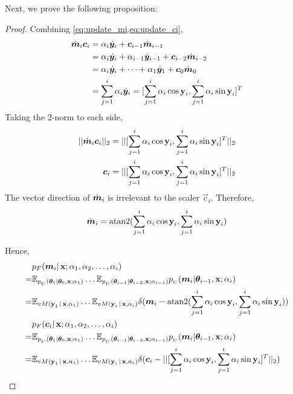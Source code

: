 Next, we prove the following proposition:
\cirflowequiv*
\begin{proof}
Combining \cref{eq:update_mi,eq:update_ci},
\begin{align*}
\dotm_{i}\vec{c}_i&=\alpha_i \doty_i+\vec{c}_{i-1}\dotm_{i-1}\\
&=\alpha_i \doty_i + \alpha_{i-1} \doty_{i-1}+\vec{c}_{i-2}\dotm_{i-2}\\
&=\alpha_i \doty_i + \dots + \alpha_{1} \doty_{1}+\vec{c}_0 \dotm_{0}\\
&=\sum_{j=1}^i \alpha_i \doty_i=[\sum_{j=1}^i \alpha_i\cos \y_i,\sum_{j=1}^i \alpha_i\sin \y_i]^T
\end{align*}
Taking the 2-norm to each side,
\begin{align*}
    ||\dotm_{i}\vec{c}_i||_2&=||[\sum_{j=1}^i \alpha_i\cos \y_i,\sum_{j=1}^i \alpha_i\sin \y_i]^T||_2\\
    \vec{c}_i&=||[\sum_{j=1}^i \alpha_i \cos \y_i,\sum_{j=1}^i \alpha_i \sin \y_i]^T||_2
\end{align*}
The vector direction of $\dotm_{i}$ is irrelevant to the scaler $\vec{c}_i$. Therefore,
\begin{equation}
    \dotm_{i}=\text{atan2}(\sum_{j=1}^i \alpha_i \cos \y_i,\sum_{j=1}^i \alpha_i \sin \y_i)
\end{equation}

Hence,
\begin{align*}
&p_F(\vec{m}_i|\x;\alpha_1,\alpha_2,\dots,\alpha_i)\\=&\E_{\update(\parsnt{1} \mid \parsnt{0}, \x ; \alphat{1})}\dots\E_{\update(\parsn_{i-1} \mid \parsnt{i-2}, \x; \alphat{i-1})} \update(\vm_{i} | \parsnt{i-1},\x;\alphat{i} ) \\
=& \E_{vM(\y_1|\x,\alpha_1)}\dots\E_{vM(\y_i|\x,\alpha_i)} \delta(\vec{m}_{i}-\text{atan2}(\sum_{j=1}^i \alpha_i \cos \y_i,\sum_{j=1}^i \alpha_i \sin \y_i))\\
&p_F(\vec{c}_i|\x;\alpha_1,\alpha_2,\dots,\alpha_i)\\=&\E_{\update(\parsnt{1} \mid \parsnt{0}, \x ; \alphat{1})}\dots\E_{\update(\parsn_{i-1} \mid \parsnt{i-2}, \x; \alphat{i-1})} \update(\vm_{i} | \parsnt{i-1},\x;\alphat{i} ) \\
=& \E_{vM(\y_1|\x,\alpha_1)}\dots\E_{vM(\y_i|\x,\alpha_i)} \delta(\vec{c}_{i}-||[\sum_{j=1}^i \alpha_i\cos \y_i,\sum_{j=1}^i \alpha_i\sin \y_i]^T||_2)
\end{align*}
\end{proof}

